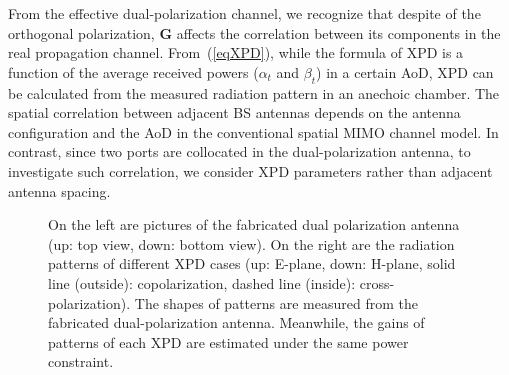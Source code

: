 \documentclass[journal]{IEEEtran}
\begin{document}
From the effective dual-polarization channel, we recognize that despite of the orthogonal polarization, $\pmb{G}$ affects the correlation between its components in the real propagation channel. From~(\ref{eqXPD}), while the formula of XPD is a function of the average received powers ($\alpha_t$ and $\beta_t$) in a certain AoD, XPD can be calculated from the measured radiation pattern in an anechoic chamber. The spatial correlation between adjacent BS antennas depends on the antenna configuration and the AoD in the conventional spatial MIMO channel model. In contrast, since two ports are collocated in the dual-polarization antenna, to investigate such correlation, we consider XPD parameters rather than adjacent antenna spacing.
\begin{figure}[!t]
	\caption{On the left are pictures of the fabricated dual polarization antenna (up: top view, down: bottom view). On the right are the radiation patterns of different XPD cases (up: E-plane, down: H-plane, solid line (outside): copolarization, dashed line (inside): cross-polarization). The shapes of patterns are measured from the fabricated dual-polarization antenna. Meanwhile, the gains of patterns of each XPD are estimated under the same power constraint.}
	\label{pattern}
\end{figure}





\end{document}
